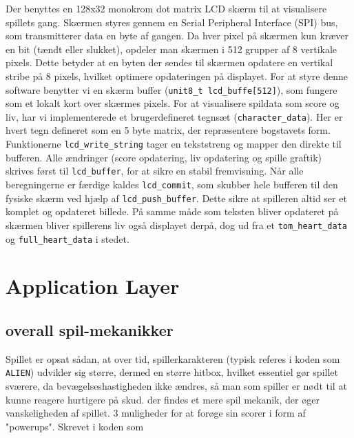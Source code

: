 Der benyttes en 128x32 monokrom dot matrix LCD skærm til at visualisere spillets gang. Skærmen styres gennem en Serial Peripheral Interface (SPI) bus, som transmitterer data en byte af gangen. Da hver pixel på skærmen kun kræver en bit (tændt eller slukket), opdeler man skærmen i 512 grupper af 8 vertikale pixels. Dette betyder at en byten der sendes til skærmen opdatere en vertikal stribe på 8 pixels, hvilket optimere opdateringen på displayet. For at styre denne software benytter vi en skærm buffer (\lstinline!unit8_t lcd_buffe[512]!), som fungere som et lokalt kort over skærmes pixels. 
For at visualisere spildata som score og liv, har vi implementerede et brugerdefineret tegnsæt (\lstinline!character_data!). Her er hvert tegn defineret som en 5 byte matrix, der repræsentere bogstavets form.
Funktionerne \lstinline!lcd_write_string! tager en tekststreng og mapper den direkte til bufferen. Alle ændringer (score opdatering, liv opdatering og spille graftik) skrives først til \lstinline!lcd_buffer!, for at sikre en stabil fremvisning. Når alle beregningerne er færdige kaldes \lstinline!lcd_commit!, som skubber hele bufferen til den fysiske skærm ved hjælp af \lstinline!lcd_push_buffer!. Dette sikre at spilleren altid ser et komplet og opdateret billede. 
På samme måde som teksten bliver opdateret på skærmen bliver spillerens liv også displayet derpå, dog ud fra et \lstinline!tom_heart_data! og \lstinline!full_heart_data! i stedet.




\section{Application Layer} \label{chap:Projektstruktur_sec:softwere}
\vspace{0.5em}

\vspace{3pt}
\subsection{overall spil-mekanikker}
\vspace{3pt}

Spillet er opsat sådan, at over tid, spillerkarakteren (typisk referes i koden som \lstinline!ALIEN!)  udvikler sig større, dermed en større hitbox, hvilket essentiel gør spillet sværere, da bevægelseshastigheden ikke ændres, så man som spiller er nødt til at kunne reagere hurtigere på skud. der findes et mere spil mekanik, der øger vanskeligheden af spillet. 3 muligheder for at forøge sin scorer i form af "powerups". Skrevet i koden som \lstinline!!

